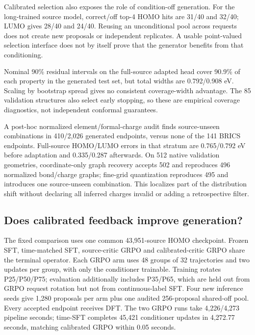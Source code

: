 \documentclass[11pt,a4paper]{article}
\begin{document}
Calibrated selection also exposes the role of condition-off generation.
For the long-trained source model, correct/off top-4 HOMO hits are 31/40
and 32/40; LUMO gives 28/40 and 24/40. Reusing an unconditional pool
across requests does not create new proposals or independent replicates.
A usable point-valued selection interface does not by itself prove that
the generator benefits from that conditioning.

Nominal 90\% residual intervals on the full-source adapted head cover
90.9\% of each property in the generated test set, but total widths are
0.792/0.908 eV. Scaling by bootstrap spread gives no consistent
coverage-width advantage. The 85 validation structures also select early
stopping, so these are empirical coverage diagnostics, not independent
conformal guarantees.

A post-hoc normalized element/formal-charge audit finds source-unseen
combinations in 410/2,026 generated endpoints, versus none of the 141
BRICS endpoints. Full-source HOMO/LUMO errors in that stratum are
0.765/0.792 eV before adaptation and 0.335/0.287 afterwards. On 512
native validation geometries, coordinate-only graph recovery accepts 502
and reproduces 496 normalized bond/charge graphs; fine-grid quantization
reproduces 495 and introduces one source-unseen combination. This
localizes part of the distribution shift without declaring all inferred
charges invalid or adding a retrospective filter.

\FloatBarrier
\subsection{Does calibrated feedback improve
generation?}\label{does-calibrated-feedback-improve-generation}

The fixed comparison uses one common 43,951-source HOMO checkpoint.
Frozen SFT, time-matched SFT, source-critic GRPO and calibrated-critic
GRPO share the terminal operator. Each GRPO arm uses 48 groups of 32
trajectories and two updates per group, with only the conditioner
trainable. Training rotates P25/P50/P75; evaluation additionally
includes P35/P65, which are held out from GRPO request rotation but not
from continuous-label SFT. Four new inference seeds give 1,280 proposals
per arm plus one audited 256-proposal shared-off pool. Every accepted
endpoint receives DFT. The two GRPO runs take 4,226/4,273 pipeline
seconds; time-SFT completes 45,421 conditioner updates in 4,272.77
seconds, matching calibrated GRPO within 0.05 seconds.
\end{document}
